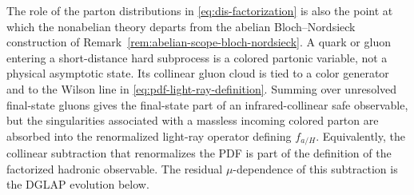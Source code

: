 The role of the parton distributions in
\eqref{eq:dis-factorization} is also the point at which the nonabelian theory
departs from the abelian Bloch--Nordsieck construction of
Remark~\ref{rem:abelian-scope-bloch-nordsieck}.  A quark or gluon entering a
short-distance hard subprocess is a colored partonic variable, not a physical
asymptotic state.  Its collinear gluon cloud is tied to a color generator and
to the Wilson line in \eqref{eq:pdf-light-ray-definition}.  Summing over
unresolved final-state gluons gives the final-state part of an
infrared-collinear safe observable, but the singularities associated with a
massless incoming colored parton are absorbed into the renormalized light-ray
operator defining \(f_{a/H}\).  Equivalently, the collinear subtraction that
renormalizes the PDF is part of the definition of the factorized hadronic
observable.  The residual \(\mu\)-dependence of this subtraction is the
DGLAP evolution below.

